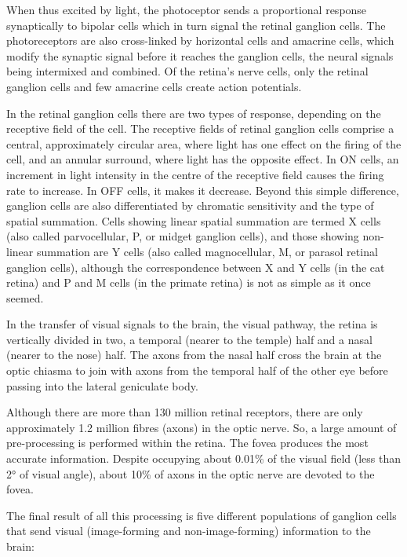When thus excited by light, the photoceptor sends a proportional response synaptically to bipolar cells which in turn signal the retinal ganglion cells. The photoreceptors are also cross-linked by horizontal cells and amacrine cells, which modify the synaptic signal before it reaches the ganglion cells, the neural signals being intermixed and combined. Of the retina's nerve cells, only the retinal ganglion cells and few amacrine cells create action potentials.

In the retinal ganglion cells there are two types of response, depending on the receptive field of the cell. The receptive fields of retinal ganglion cells comprise a central, approximately circular area, where light has one effect on the firing of the cell, and an annular surround, where light has the opposite effect. In ON cells, an increment in light intensity in the centre of the receptive field causes the firing rate to increase. In OFF cells, it makes it decrease. Beyond this simple difference, ganglion cells are also differentiated by chromatic sensitivity and the type of spatial summation. Cells showing linear spatial summation are termed X cells (also called parvocellular, P, or midget ganglion cells), and those showing non-linear summation are Y cells (also called magnocellular, M, or parasol retinal ganglion cells), although the correspondence between X and Y cells (in the cat retina) and P and M cells (in the primate retina) is not as simple as it once seemed.

In the transfer of visual signals to the brain, the visual pathway, the retina is vertically divided in two, a temporal (nearer to the temple) half and a nasal (nearer to the nose) half. The axons from the nasal half cross the brain at the optic chiasma to join with axons from the temporal half of the other eye before passing into the lateral geniculate body.

Although there are more than 130 million retinal receptors, there are only approximately 1.2 million fibres (axons) in the optic nerve. So, a large amount of pre-processing is performed within the retina. The fovea produces the most accurate information. Despite occupying about 0.01\% of the visual field (less than 2° of visual angle), about 10\% of axons in the optic nerve are devoted to the fovea.

The final result of all this processing is five different populations of ganglion cells that send visual (image-forming and non-image-forming) information to the brain:

